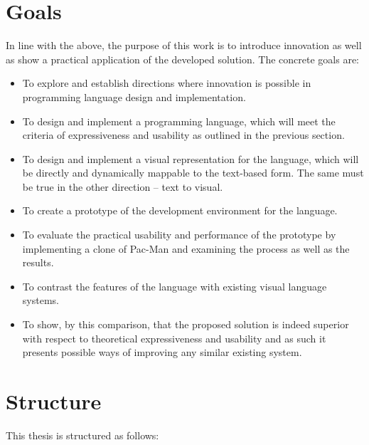 \section{Goals}
In line with the above, the purpose of this work is to introduce innovation as well as show a practical application of the developed solution. The concrete goals are:
\begin{itemize}
	\item To explore and establish directions where innovation is possible in programming language design and implementation.
	\item To design and implement a programming language, which will meet  the criteria of expressiveness and usability as outlined in the previous section.
    \item To design and implement a visual representation for the language, which will be directly and dynamically mappable to the text-based form. The same must be true in the other direction -- text to visual.
	\item To create a prototype of the development environment for the language.
    \item To evaluate the practical usability and performance of the prototype by implementing a clone of Pac-Man and examining the process as well as the results.
    \item To contrast the features of the language with existing visual language systems.
    \item To show, by this comparison, that the proposed solution is indeed superior with respect to theoretical expressiveness and usability and as such it presents possible ways of improving any similar existing system. 
\end{itemize}

\section{Structure}
This thesis is structured as follows:

